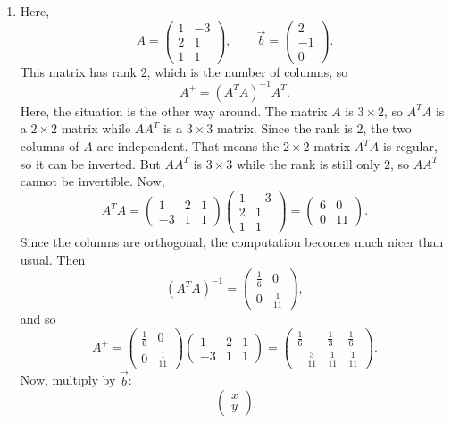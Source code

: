 \documentclass[10pt]{extarticle}
\begin{document}
\begin{enumerate}[label=(\alph*)]
\item Here,
\[
A=
\begin{pmatrix}
1 & -3\\
2 & 1\\
1 & 1
\end{pmatrix},
\qquad
\vec{b}=
\begin{pmatrix}
2\\-1\\0
\end{pmatrix}.
\]
This matrix has rank $2$, which is the number of columns, so
\[
A^+=(A^TA)^{-1}A^T.
\]
Here, the situation is the other way around. The matrix $A$ is $3\times 2$, so $A^TA$ is a $2\times 2$ matrix while $AA^T$ is a $3\times 3$ matrix. Since the rank is $2$, the two columns of $A$ are independent. That means the $2\times 2$ matrix $A^TA$ is regular, so it can be inverted. But $AA^T$ is $3\times 3$ while the rank is still only $2$, so $AA^T$ cannot be invertible. Now,
\[
A^TA=
\begin{pmatrix}
1 & 2 & 1\\
-3 & 1 & 1
\end{pmatrix}
\begin{pmatrix}
1 & -3\\
2 & 1\\
1 & 1
\end{pmatrix}
=
\begin{pmatrix}
6 & 0\\
0 & 11
\end{pmatrix}.
\]
Since the columns are orthogonal, the computation becomes much nicer than usual. Then
\[
(A^TA)^{-1}=
\begin{pmatrix}
\frac{1}{6} & 0\\[0.4em]
0 & \frac{1}{11}
\end{pmatrix},
\]
and so
\[
A^+=
\begin{pmatrix}
\frac{1}{6} & 0\\[0.4em]
0 & \frac{1}{11}
\end{pmatrix}
\begin{pmatrix}
1 & 2 & 1\\
-3 & 1 & 1
\end{pmatrix}
=
\begin{pmatrix}
\frac{1}{6} & \frac{1}{3} & \frac{1}{6}\\[0.4em]
-\frac{3}{11} & \frac{1}{11} & \frac{1}{11}
\end{pmatrix}.
\]
Now, multiply by $\vec{b}$:
\[
\begin{pmatrix}
x\\y
\end{pmatrix}
\]
\end{enumerate}
\end{document}
